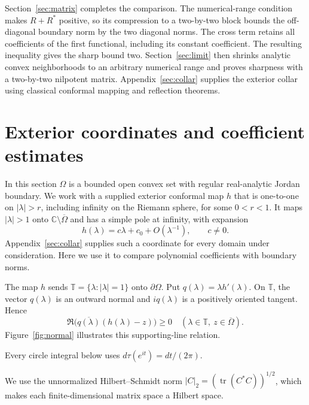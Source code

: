 \documentclass[11pt]{article}
\newcommand{\C}{\mathbb C}
\newcommand{\T}{\mathbb T}
\newcommand{\HS}[1]{\lvert #1\rvert_2}
\DeclareMathOperator{\tr}{tr}
\theoremstyle{remark}\newtheorem{remark}[theorem]{Remark}
\numberwithin{equation}{section}
\begin{document}
Section~\ref{sec:matrix} completes the comparison. The numerical-range
condition makes $R+R^*$ positive, so its compression to a two-by-two
block bounds the off-diagonal boundary norm by the two diagonal norms.
The cross term retains all coefficients of the first functional, including
its constant coefficient. The resulting inequality gives the sharp bound
two. Section~\ref{sec:limit} then shrinks analytic convex neighborhoods
to an arbitrary numerical range and proves sharpness with a two-by-two
nilpotent matrix. Appendix~\ref{sec:collar} supplies the exterior collar
using classical conformal mapping and reflection theorems.
\section{Exterior coordinates and coefficient estimates}\label{sec:coefficients}
In this section $\Omega$ is a bounded open convex set with regular real-analytic Jordan boundary. We work with a supplied exterior conformal map $h$ that is one-to-one on $|\lambda|>r$, including infinity on the Riemann sphere, for some $0<r<1$. It maps $|\lambda|>1$ onto $\C\setminus\overline\Omega$ and has a simple pole at infinity, with expansion
\begin{equation}\label{eq:h}
 h(\lambda)=c\lambda+c_0+O(\lambda^{-1}),\qquad c\ne0.
\end{equation}
Appendix~\ref{sec:collar} supplies such a coordinate for every domain under consideration. Here we use it to compare polynomial coefficients with boundary norms.

The map $h$ sends $\T=\{\lambda:|\lambda|=1\}$ onto $\partial\Omega$. Put $q(\lambda)=\lambda h'(\lambda)$. On $\T$, the vector $q(\lambda)$ is an outward normal and $iq(\lambda)$ is a positively oriented tangent. Hence
\begin{equation}\label{eq:support}
 \Re\bigl(\overline{q(\lambda)}(h(\lambda)-z)\bigr)\ge0
 \quad(\lambda\in\T,\ z\in\overline\Omega).
\end{equation}
Figure~\ref{fig:normal} illustrates this supporting-line relation.



Every circle integral below uses $d\tau(e^{it})=dt/(2\pi)$.

We use the unnormalized Hilbert--Schmidt norm $\HS C=(\tr(C^*C))^{1/2}$, which makes each finite-dimensional matrix space a Hilbert space.
\end{document}
